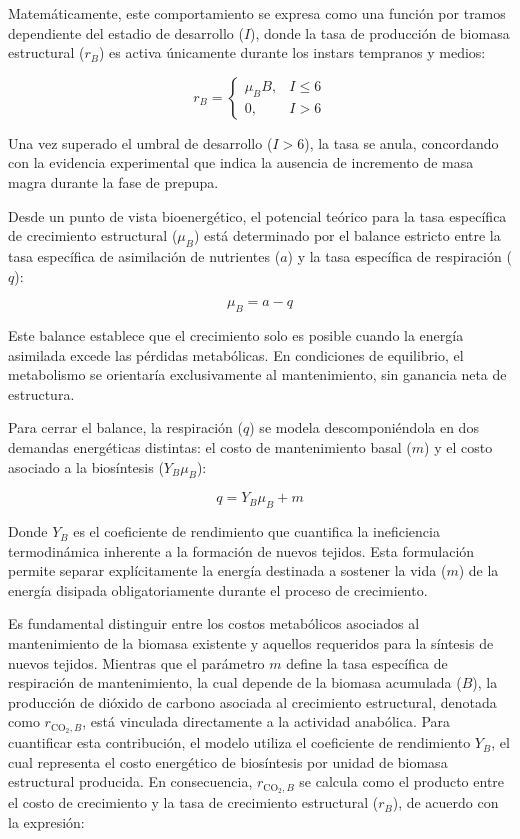 Matemáticamente, este comportamiento se expresa como una función por tramos dependiente del 
estadio de desarrollo ($I$), donde la tasa de producción de biomasa estructural ($r_B$) es activa 
únicamente durante los instars tempranos y medios:

\begin{equation}
r_B = \begin{cases} 
\mu_B B, & I \leq 6 \\
0, & I > 6 
\end{cases}
\end{equation}

Una vez superado el umbral de desarrollo ($I > 6$), la tasa se anula, concordando con la evidencia 
experimental que indica la ausencia de incremento de masa magra durante la fase de prepupa.

Desde un punto de vista bioenergético, el potencial teórico para la tasa específica de crecimiento 
estructural ($\mu_B$) está determinado por el balance estricto entre la tasa específica de asimilación 
de nutrientes ($a$) y la tasa específica de respiración ($q$):

\begin{equation}
\mu_B = a - q
\end{equation}

Este balance establece que el crecimiento solo es posible cuando la energía asimilada excede las 
pérdidas metabólicas. En condiciones de equilibrio, el metabolismo se orientaría exclusivamente 
al mantenimiento, sin ganancia neta de estructura.

Para cerrar el balance, la respiración ($q$) se modela descomponiéndola en dos demandas energéticas 
distintas: el costo de mantenimiento basal ($m$) y el costo asociado a la biosíntesis ($Y_B \mu_B$):

\begin{equation}
q = Y_B \mu_B + m
\end{equation}

Donde $Y_B$ es el coeficiente de rendimiento que cuantifica la ineficiencia termodinámica inherente 
a la formación de nuevos tejidos. Esta formulación permite separar explícitamente la energía destinada 
a sostener la vida ($m$) de la energía disipada obligatoriamente durante el proceso de crecimiento.

Es fundamental distinguir entre los costos metabólicos asociados al mantenimiento de la biomasa 
existente y aquellos requeridos para la síntesis de nuevos tejidos. Mientras que el parámetro $m$ 
define la tasa específica de respiración de mantenimiento, la cual depende de la biomasa acumulada ($B$), 
la producción de dióxido de carbono asociada al crecimiento estructural, denotada como 
$r_{\mathrm{CO_2},B}$, está vinculada directamente a la actividad anabólica. Para cuantificar 
esta contribución, el modelo utiliza el coeficiente de rendimiento $Y_B$, el cual representa 
el costo energético de biosíntesis por unidad de biomasa estructural producida. En consecuencia, 
$r_{\mathrm{CO_2},B}$ se calcula como el producto entre el costo de crecimiento y la tasa de 
crecimiento estructural ($r_B$), de acuerdo con la expresión:

